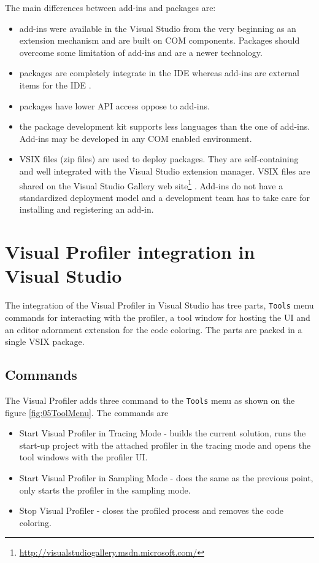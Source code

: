The main differences between add-ins and packages are:
\begin{itemize}	
\item  add-ins were available in the Visual Studio from the very beginning as an extension mechanism and are built on COM components. Packages should overcome some limitation of add-ins and are a newer technology.

\item packages are completely integrate in the IDE whereas add-ins are external items for the IDE  .

\item packages have lower API access oppose to add-ins.

\item the package development kit supports less languages than the one of add-ins. Add-ins may be developed in any COM enabled environment.

\item VSIX files (zip files) are used to deploy packages. They are self-containing and well integrated with the Visual Studio extension manager. VSIX files are shared on the Visual Studio Gallery web site\footnote{\href{http://visualstudiogallery.msdn.microsoft.com/}{http://visualstudiogallery.msdn.microsoft.com/}}
. Add-ins do not have a standardized deployment model and a development team has to take care for installing and registering an add-in.
\end{itemize}


\section{Visual Profiler integration in Visual Studio}
The integration of the Visual Profiler in Visual Studio has tree parts, \texttt{Tools} menu commands for interacting with the profiler, a tool window for hosting the UI and an editor adornment extension for the code coloring. The parts are packed in a single VSIX package.

\subsection{Commands}
The Visual Profiler adds three command to the \texttt{Tools} menu as shown on the figure \ref{fig:05ToolMenu}. The commands are


\begin{itemize}
\item Start Visual Profiler in Tracing Mode - builds the current solution, runs the start-up project with the attached profiler in the tracing mode and opens the tool windows with the profiler UI.

\item Start Visual Profiler in Sampling Mode - does the same as the previous point, only  starts the profiler in the sampling mode.

\item Stop Visual Profiler - closes the profiled process and removes the code coloring.
\end{itemize}

